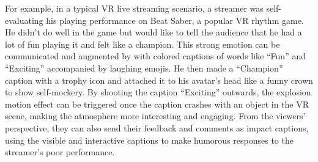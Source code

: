 For example, in a typical VR live streaming scenario, a streamer was self-evaluating his playing performance on Beat Saber, a popular VR rhythm game. He didn't do well in the game but would like to tell the audience that he had a lot of fun playing it and felt like a champion. This strong emotion can be communicated and augmented by \system{} with colored captions of words like ``Fun'' and ``Exciting'' accompanied by laughing emojis. 
He then made a ``Champion'' caption with a trophy icon and attached it to his avatar's head like a funny crown to show self-mockery.
By shooting the caption ``Exciting'' outwards, the explosion motion effect can be triggered once the caption crashes with an object in the VR scene, making the atmosphere more interesting and engaging. From the viewers' perspective, they can also send their feedback and comments as impact captions, using the visible and interactive captions to make humorous responses to the streamer's poor performance.




